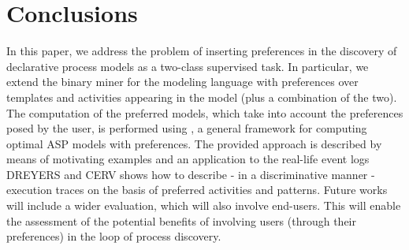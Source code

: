 

\section{Conclusions}
\label{sec:conclusions}

In this paper, we address the problem of inserting  preferences in the discovery of declarative process models as a two-class supervised task. In particular, we extend the \nd binary miner for the \declare modeling language with preferences over \declare templates and activities appearing in the model (plus a combination of the two). 
The computation of the preferred models, which take into account the preferences posed by the  user, is performed using \asprin, a general framework for computing optimal ASP models with preferences. The provided approach is described by means of motivating examples and an application to the real-life event logs DREYERS and CERV shows how to describe - in a discriminative manner - execution traces on the basis of preferred %
activities and \declare patterns. Future works will include a wider evaluation, which will also involve end-users. This will enable the assessment of the potential benefits of involving users (through their preferences) in the loop of process discovery.

